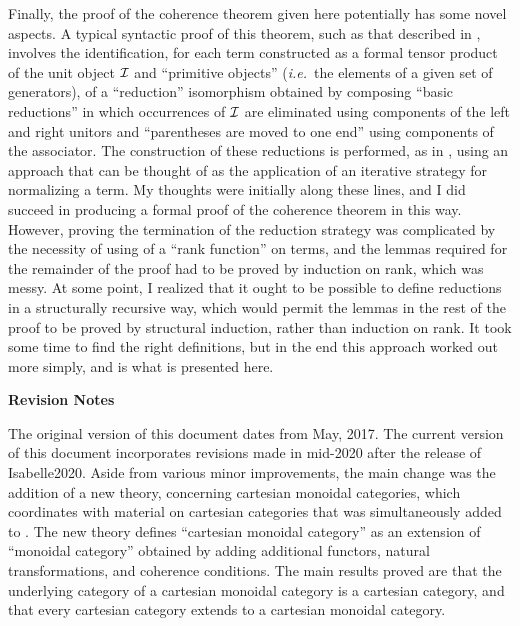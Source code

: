 \documentclass[11pt,notitlepage,a4paper]{report}
\begin{document}
Finally, the proof of the coherence theorem given here potentially has some
novel aspects.  A typical syntactic proof of this theorem, such as that described
in \cite{MacLane71}, involves the identification, for each term constructed
as a formal tensor product of the unit object ${\cal I}$ and ``primitive objects''
({\em i.e.}~the elements of a given set of generators), of a ``reduction''
isomorphism obtained by composing ``basic reductions'' in which occurrences
of ${\cal I}$ are eliminated using components of the left and right unitors and
``parentheses are moved to one end'' using components of the associator.
The construction of these reductions is performed, as in \cite{MacLane71},
using an approach that can be thought of as the application of an iterative
strategy for normalizing a term.
My thoughts were initially along these lines, and I did succeed in producing
a formal proof of the coherence theorem in this way.  However, proving the
termination of the reduction strategy was complicated by the necessity of using
of a ``rank function'' on terms, and the lemmas required for the remainder of the
proof had to be proved by induction on rank, which was messy.
At some point, I realized that it ought to be possible to define reductions
in a structurally recursive way, which would permit the lemmas in the rest of
the proof to be proved by structural induction, rather than induction on rank.
It took some time to find the right definitions, but in the end this
approach worked out more simply, and is what is presented here.

\medskip\par\noindent
{\bf Revision Notes}

The original version of this document dates from May, 2017.
The current version of this document incorporates revisions made in mid-2020
after the release of Isabelle2020.  Aside from various minor improvements,
the main change was the addition of a new theory, concerning cartesian monoidal categories,
which coordinates with material on cartesian categories that was simultaneously
added to \cite{Category3-AFP}.  The new theory defines ``cartesian monoidal category''
as an extension of ``monoidal category'' obtained by adding additional functors,
natural transformations, and coherence conditions.  The main results proved are that
the underlying category of a cartesian monoidal category is a cartesian category,
and that every cartesian category extends to a cartesian monoidal category.





\end{document}
